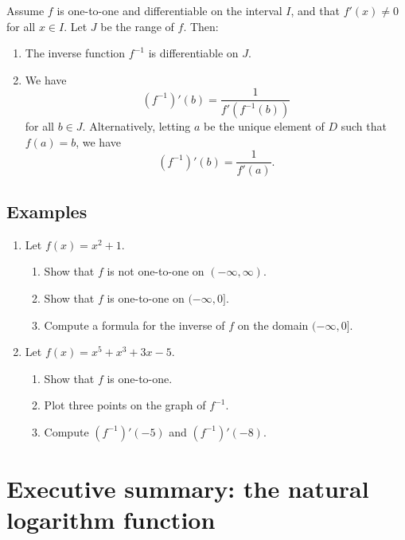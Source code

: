 \begin{namedtheorem} Assume $f$ is one-to-one and differentiable on the interval $I$, and that $f'(x)\ne 0$ for all $x\in I$. Let $J$ be the range of $f$. Then:
  \begin{enumerate}
    \item The inverse function $f^{-1}$ is differentiable on $J$.
    \item We have
    \[
    (f^{-1})'(b)=\frac{1}{f'(f^{-1}(b))}
    \]
    for all $b\in J$. Alternatively, letting $a$ be the unique element of $D$ such that $f(a)=b$, we have
    \[
    (f^{-1})'(b)=\frac{1}{f'(a)}.
    \]
  \end{enumerate}

\end{namedtheorem}

\subsection*{Examples}
\begin{enumerate}
  \item Let $f(x)=x^2+1$.
  \begin{enumerate}
    \item Show that $f$ is not one-to-one on $(-\infty, \infty)$.
    \item Show that $f$ is one-to-one on $(-\infty, 0]$.
    \item Compute a formula for the inverse of $f$ on the domain $(-\infty, 0]$. 
  \end{enumerate}
  \item Let $f(x)=x^5+x^3+3x-5$.
  \begin{enumerate}
    \item Show that $f$ is one-to-one.
    \item Plot three points on the graph of $f^{-1}$.
    \item Compute $(f^{-1})'(-5)$ and $(f^{-1})'(-8)$.
  \end{enumerate}
\end{enumerate}




\newpage

\section{Executive summary: the natural logarithm function}

